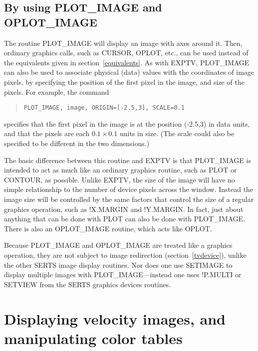 \subsection{By using PLOT\_IMAGE and OPLOT\_IMAGE}

The routine PLOT\_IMAGE will display an image with axes around it.  Then,
ordinary graphics calls, such as CURSOR, OPLOT, etc., can be used instead of
the equivalents given in section~\ref{equivalents}.  As with EXPTV, PLOT\_IMAGE
can also be used to associate physical (data) values with the coordinates of
image pixels, by specifying the position of the first pixel in the image, and
size of the pixels.  For example, the command
\begin{quote}
\begin{verbatim}
PLOT_IMAGE, image, ORIGIN=[-2.5,3], SCALE=0.1
\end{verbatim}
\end{quote}
specifies that the first pixel in the image is at the position (-2.5,3) in data
units, and that the pixels are each \mbox{$0.1 \times 0.1$} units in size.
(The scale could also be specified to be different in the two dimensions.)

The basic difference between this routine and EXPTV is that PLOT\_IMAGE is
intended to act as much like an ordinary graphics routine, such as PLOT or
CONTOUR, as possible.  Unlike EXPTV, the size of the image will have no simple
relationship to the number of device pixels across the window.  Instead the
image size will be controlled by the same factors that control the size of a
regular graphics operation, such as !X.MARGIN and !Y.MARGIN.  In fact, just
about anything that can be done with PLOT can also be done with PLOT\_IMAGE.
There is also an OPLOT\_IMAGE routine, which acts like OPLOT.

Because PLOT\_IMAGE and OPLOT\_IMAGE are treated like a graphics operation,
they are not subject to image redirection (section~\ref{tvdevice}), unlike the
other SERTS image display routines.  Nor does one use SETIMAGE to display
multiple images with PLOT\_IMAGE---instead one uses !P.MULTI or SETVIEW from
the SERTS graphics devices routines.

\section{Displaying velocity images, and manipulating color tables}

